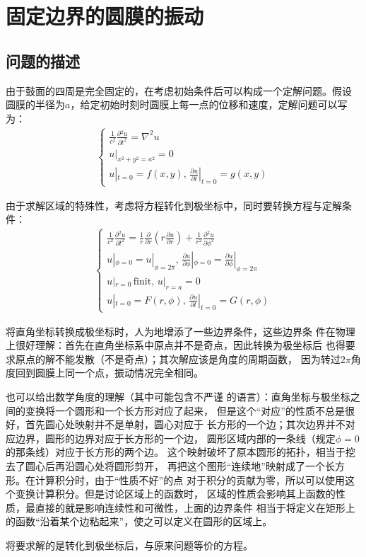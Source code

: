\documentclass[a4paper]{ctexart}
\newcommand{\mr}[1]{\mathrm{#1}}
\newcommand{\pdv}[2]{\frac{\partial{#1}}{\partial{#2}}}
\begin{document}
	\section{固定边界的圆膜的振动}
	\subsection{问题的描述}
	由于鼓面的四周是完全固定的，在考虑初始条件后可以构成一个定解问题。假设
	圆膜的半径为$a$，给定初始时刻时圆膜上每一点的位移和速度，定解问题可以写为：
	\begin{align}
		\left\{
			\begin{array}{lr}
				\displaystyle\frac{1}{c^2}\pdv{^{2}u}{t^2} = \nabla^{2}u\\
				u|_{x^2 + y^2 = a^2} = 0\\
				u|_{t=0} = f(x, y),\, \pdv{u}{t}|_{t=0} = g(x, y)
			\end{array}
		\right.
	\end{align}
	\par 由于求解区域的特殊性，考虑将方程转化到极坐标中，同时要转换方程与定解条件：
	\begin{align}
		\left\{
			\begin{array}{lr}
				\displaystyle\frac{1}{c^2}\pdv{^{2}u}{t^2} = \frac{1}{r}\pdv{}{r}\left(r\pdv{u}{r}\right) + \frac{1}{r^2}\pdv{^2 u}{\phi^{2}}\\
				u|_{\phi=0} = u|_{\phi=2\pi},\, \pdv{u}{\phi}|_{\phi=0} = \pdv{u}{\phi}|_{\phi=2\pi}\\
				u|_{r=0}\,\mr{finit},\, u|_{r=a}=0\\
				u|_{t=0} = F(r, \phi),\, \pdv{u}{t}|_{t=0} = G(r, \phi)
			\end{array}
			\label{wave eq of drum}
		\right.
	\end{align}
	\par 将直角坐标转换成极坐标时，人为地增添了一些边界条件，这些边界条
	件在物理上很好理解：首先在直角坐标系中原点并不是奇点，因此转换为极坐标后
	也得要求原点的解不能发散（不是奇点）；其次解应该是角度的周期函数，
	因为转过$2\pi$角度回到圆膜上同一个点，振动情况完全相同。
	\par 也可以给出数学角度的理解（其中可能包含不严谨
	的语言）：直角坐标与极坐标之间的变换将一个圆形和一个长方形对应了起来，
	但是这个“对应”的性质不总是很好，首先圆心处映射并不是单射，圆心对应于
	长方形的一个边；其次边界并不对应边界，圆形的边界对应于长方形的一个边，
	圆形区域内部的一条线（规定$\phi=0$的那条线）对应于长方形的两个边。
	这个映射破坏了原本圆形的拓扑，相当于挖去了圆心后再沿圆心处将圆形剪开，
	再把这个图形“连续地”映射成了一个长方形。在计算积分时，由于“性质不好”的点
	对于积分的贡献为零，所以可以使用这个变换计算积分。但是讨论区域上的函数时，
	区域的性质会影响其上函数的性质，最直接的就是影响连续性和可微性，上面的边界条件
	相当于将定义在矩形上的函数“沿着某个边粘起来”，使之可以定义在圆形的区域上。
	\par 将要求解的是转化到极坐标后，与原来问题等价的方程。
\end{document}
